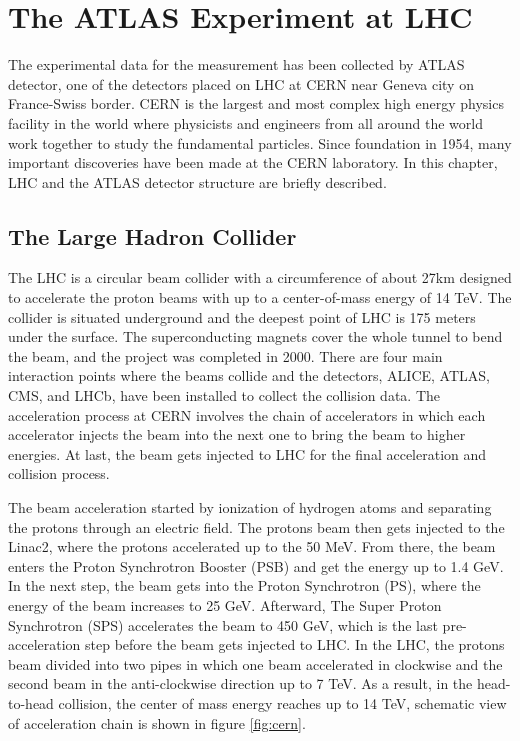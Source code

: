 
\chapter{The ATLAS Experiment at LHC} %

\label{Chapter3} %

The experimental data for the measurement has been collected by ATLAS detector, one of the detectors placed on LHC at CERN near Geneva city on France-Swiss border. CERN is the largest and most complex high energy physics facility in the world where physicists and engineers from all around the world work together to study the fundamental particles. Since foundation in 1954, many important discoveries have been made at the CERN laboratory. In this chapter, LHC and the ATLAS detector structure are briefly described.%

\section{The Large Hadron Collider}
\label{section:LHC}

The LHC is a circular beam collider with a circumference of about 27km designed to accelerate the proton beams with up to a center-of-mass energy of 14 TeV. The collider is situated underground and the deepest point of LHC is 175 meters under the surface. The superconducting magnets cover the whole tunnel to bend the beam, and the project was completed in 2000. There are four main interaction points where the beams collide and the detectors, ALICE, ATLAS, CMS, and LHCb, have been installed to collect the collision data. The acceleration process at CERN involves the chain of accelerators in which each accelerator injects the beam into the next one to bring the beam to higher energies. At last, the beam gets injected to LHC for the final acceleration and collision process.

The beam acceleration started by ionization of hydrogen atoms and separating the protons through an electric field. The protons beam then gets injected to the Linac2, where the protons accelerated up to the 50 MeV. From there, the beam enters the Proton Synchrotron Booster (PSB) and get the energy up to 1.4 GeV. In the next step, the beam gets into the Proton Synchrotron (PS), where the energy of the beam increases to 25 GeV. Afterward, The Super Proton Synchrotron (SPS) accelerates the beam to 450 GeV, which is the last pre-acceleration step before the beam gets injected to LHC. In the LHC, the protons beam divided into two pipes in which one beam accelerated in clockwise and the second beam in the anti-clockwise direction up to 7 TeV. As a result, in the head-to-head collision, the center of mass energy reaches up to 14 TeV, schematic view of acceleration chain is shown in figure \ref{fig:cern}.

